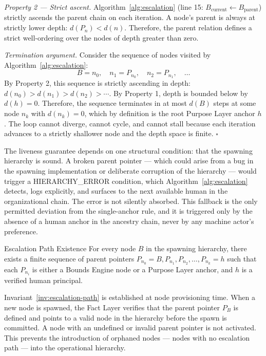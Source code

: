 \noindent\textit{Property 2 — Strict ascent.} Algorithm~\ref{alg:escalation} (line 15: $B_{\text{current}} \leftarrow B_{\text{parent}}$) strictly ascends the parent chain on each iteration. A node's parent is always at strictly lower depth: $d(P_n) < d(n)$. Therefore, the parent relation defines a strict well-ordering over the nodes of depth greater than zero.

\medskip

\noindent\textit{Termination argument.} Consider the sequence of nodes visited by Algorithm~\ref{alg:escalation}:
\[ B = n_0,\quad n_1 = P_{n_0},\quad n_2 = P_{n_1},\quad \ldots \]
By Property 2, this sequence is strictly ascending in depth: $d(n_0) > d(n_1) > d(n_2) > \cdots$. By Property 1, depth is bounded below by $d(h) = 0$. Therefore, the sequence terminates in at most $d(B)$ steps at some node $n_k$ with $d(n_k) = 0$, which by definition is the root Purpose Layer anchor $h$. The loop cannot diverge, cannot cycle, and cannot stall because each iteration advances to a strictly shallower node and the depth space is finite. $\square$

\medskip

The liveness guarantee depends on one structural condition: that the spawning hierarchy is sound. A broken parent pointer — which could arise from a bug in the spawning implementation or deliberate corruption of the hierarchy — would trigger a HIERARCHY\_ERROR condition, which Algorithm~\ref{alg:escalation} detects, logs explicitly, and surfaces to the next available human in the organizational chain. The error is not silently absorbed. This fallback is the only permitted deviation from the single-anchor rule, and it is triggered only by the absence of a human anchor in the ancestry chain, never by any machine actor's preference.

\begin{invariant}{Escalation Path Existence}
\label{inv:escalation-path}
For every node $B$ in the spawning hierarchy, there exists a finite sequence of parent pointers $P_{n_0} = B, P_{n_1}, P_{n_2}, \ldots, P_{n_k} = h$ such that each $P_{n_i}$ is either a Bounds Engine node or a Purpose Layer anchor, and $h$ is a verified human principal.
\end{invariant}

Invariant~\ref{inv:escalation-path} is established at node provisioning time. When a new node is spawned, the Fact Layer verifies that the parent pointer $P_B$ is defined and points to a valid node in the hierarchy before the spawn is committed. A node with an undefined or invalid parent pointer is not activated. This prevents the introduction of orphaned nodes — nodes with no escalation path — into the operational hierarchy.

